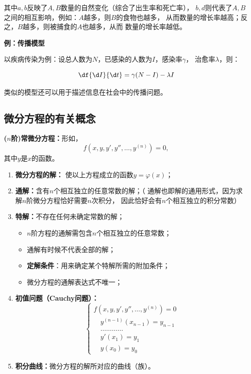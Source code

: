其中$a,b$反映了$A,B$数量的自然变化（综合了出生率和死亡率），
$b,d$则代表了$A,B$之间的相互影响，例如：$A$越多，则$B$的食物也越多，
从而数量的增长率越高；反之，$B$越多，则被捕食的$A$也越多，从而
数量的增长率越低。

{\bf 例：传播模型}

以疾病传染为例：设总人数为$N$，已感染的人数为$I$，感染率$\gamma$，
治愈率$\lambda$，则：

$$\df{\d I}{\d t}=\gamma (N-I)-\lambda I$$

类似的模型还可以用于描述信息在社会中的传播问题。

\subsection{微分方程的有关概念}

\begin{thx}
	{\bf ($n$阶)常微分方程：}形如，
	$$f(x,y,y',y'',\ldots,y^{(n)})=0,$$
	其中$y$是$x$的函数。
	\begin{enumerate}[(1)]
	  \setlength{\itemindent}{1cm}
	  \item {\bf 微分方程的解：} 使以上方程成立的函数$y=\varphi(x)$； 
	  \item {\bf 通解：}含有$n$个相互独立的任意常数的解；（{\kaishu 
	  通解也即解的通用形式，因为求解$n$阶微分方程恰好需要$n$次积分，
	  因此恰好会有$n$个相互独立的积分常数}）
	  \item {\bf 特解：}不存在任何未确定常数的解； 
	  \begin{itemize}
	    \item $n$阶方程的通解需包含$n$个相互独立的任意常数；
	    \item 通解有时候不代表全部的解；
	    \item {\bf 定解条件}：用来确定某个特解所需的附加条件；
	    \item 微分方程的通解表达式不唯一；
	  \end{itemize} 
	  \item {\bf 初值问题（Cauchy问题）：}
	  $$
	  \left\{\begin{array}{l}
	  	f(x,y,y',y'',\ldots,y^{(n)})=0\\
	  	\quad{y^{(n-1)}(x_{n-1})=y_{n-1}}\\
	  	\quad{\ldots\ldots\ldots\ldots}\\
	  	\quad{y'(x_1)=y_1}\\
	  	\quad{y(x_0)=y_0}
	  \end{array}\right.
	  $$
	  \item {\bf 积分曲线：}微分方程的解所对应的曲线（族）。
	\end{enumerate}
\end{thx}

